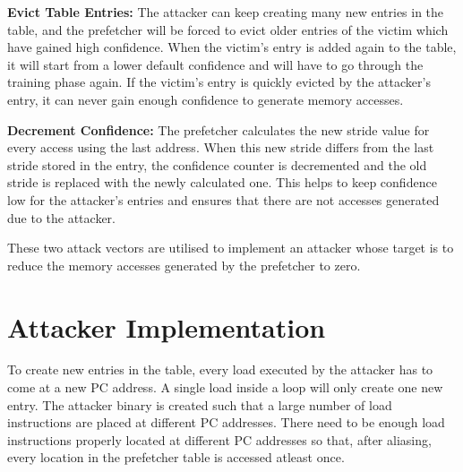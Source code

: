 \textbf{Evict Table Entries:} The attacker can keep creating many new entries
in the table, and the prefetcher will be forced to evict older entries
of the victim which have gained high confidence. When the victim's entry is added
again to the table, it will start from a lower default confidence and will have
to go through the training phase again. If the victim's entry is quickly
evicted by the attacker's entry, it can never gain enough confidence to
generate memory accesses.

\textbf{Decrement Confidence:} The prefetcher calculates the new stride value for
every access using the last address. When this new stride differs from the last stride
stored in the entry, the confidence counter is decremented and the old stride is replaced
with the newly calculated one. This helps to keep confidence low for the attacker's
entries and ensures that there are not accesses generated due to the attacker.

These two attack vectors are utilised to implement an attacker whose target is to
reduce the memory accesses generated by the prefetcher to zero.

\section{Attacker Implementation}

To create new entries in the table, every load executed by the
attacker has to come at a new PC address. A single load inside
a loop will only create one new entry. The attacker binary
is created such that a large number of load instructions
are placed at different PC addresses. There need to be
enough load instructions properly located at different PC addresses
so that, after aliasing, every location in the prefetcher table is accessed
atleast once.

